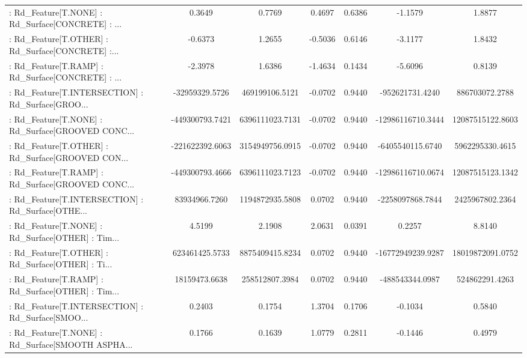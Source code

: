 \begin{longtable}{p{4cm}cccccc}
 : Rd\_Feature[T.NONE] : Rd\_Surface[CONCRETE] : ... &            0.3649 &            0.7769 &  0.4697 &       0.6386 &            -1.1579 &            1.8877 \\
 : Rd\_Feature[T.OTHER] : Rd\_Surface[CONCRETE] :... &           -0.6373 &            1.2655 & -0.5036 &       0.6146 &            -3.1177 &            1.8432 \\
 : Rd\_Feature[T.RAMP] : Rd\_Surface[CONCRETE] : ... &           -2.3978 &            1.6386 & -1.4634 &       0.1434 &            -5.6096 &            0.8139 \\
 : Rd\_Feature[T.INTERSECTION] : Rd\_Surface[GROO... &    -32959329.5726 &    469199106.5121 & -0.0702 &       0.9440 &    -952621731.4240 &    886703072.2788 \\
 : Rd\_Feature[T.NONE] : Rd\_Surface[GROOVED CONC... &   -449300793.7421 &   6396111023.7131 & -0.0702 &       0.9440 &  -12986116710.3444 &  12087515122.8603 \\
 : Rd\_Feature[T.OTHER] : Rd\_Surface[GROOVED CON... &   -221622392.6063 &   3154949756.0915 & -0.0702 &       0.9440 &   -6405540115.6740 &   5962295330.4615 \\
 : Rd\_Feature[T.RAMP] : Rd\_Surface[GROOVED CONC... &   -449300793.4666 &   6396111023.7123 & -0.0702 &       0.9440 &  -12986116710.0674 &  12087515123.1342 \\
 : Rd\_Feature[T.INTERSECTION] : Rd\_Surface[OTHE... &     83934966.7260 &   1194872935.5808 &  0.0702 &       0.9440 &   -2258097868.7844 &   2425967802.2364 \\
 : Rd\_Feature[T.NONE] : Rd\_Surface[OTHER] : Tim... &            4.5199 &            2.1908 &  2.0631 &       0.0391 &             0.2257 &            8.8140 \\
 : Rd\_Feature[T.OTHER] : Rd\_Surface[OTHER] : Ti... &    623461425.5733 &   8875409415.8234 &  0.0702 &       0.9440 &  -16772949239.9287 &  18019872091.0752 \\
 : Rd\_Feature[T.RAMP] : Rd\_Surface[OTHER] : Tim... &     18159473.6638 &    258512807.3984 &  0.0702 &       0.9440 &    -488543344.0987 &    524862291.4263 \\
 : Rd\_Feature[T.INTERSECTION] : Rd\_Surface[SMOO... &            0.2403 &            0.1754 &  1.3704 &       0.1706 &            -0.1034 &            0.5840 \\
 : Rd\_Feature[T.NONE] : Rd\_Surface[SMOOTH ASPHA... &            0.1766 &            0.1639 &  1.0779 &       0.2811 &            -0.1446 &            0.4979 \\

\end{longtable}
